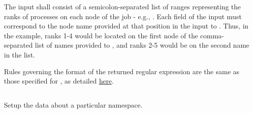 \format


\begin{arglist}
\end{arglist}

\returnsimple

\descr

The input shall consist of a semicolon-separated list of ranges representing the ranks of processes on each node of the job - e.g., . Each field of the input must correspond to the node name provided at that position in the input to . Thus, in the example, ranks 1-4 would be located on the first node of the comma-separated list of names provided to , and ranks 2-5 would be on the second name in the list.

Rules governing the format of the returned regular expression are the same as those specified for , as detailed \hyperref[regex:fmt]{here}.

\subsection{}

\summary

Setup the data about a particular namespace.

\format



